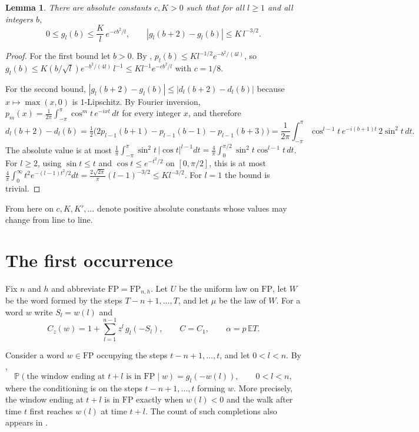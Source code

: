 \documentclass[11pt]{amsart}
\newtheorem{lemma}[theorem]{Lemma}
\theoremstyle{remark}
\numberwithin{equation}{section}
\newcommand{\PP}{\mathbb{P}}
\newcommand{\EE}{\mathbb{E}}
\newcommand{\FP}{\mathrm{FP}}
\begin{document}
\begin{lemma}\label{lem:g}
There are absolute constants $c,K>0$ such that for all $l\ge1$ and all integers $b$,
\[
0\le g_l(b)\le\frac Kl\,e^{-cb^2/l},\qquad |g_l(b+2)-g_l(b)|\le K\,l^{-3/2}.
\]
\end{lemma}

\begin{proof}
For the first bound let $b>0$. By \cite[(2.3)]{Sh26}, $p_l(b)\le Kl^{-1/2}e^{-b^2/(4l)}$, so $g_l(b)\le K(b/\sqrt l)e^{-b^2/(4l)}\,l^{-1}\le Kl^{-1}e^{-cb^2/l}$ with $c=1/8$.

For the second bound, $|g_l(b+2)-g_l(b)|\le|d_l(b+2)-d_l(b)|$ because $x\mapsto\max(x,0)$ is $1$-Lipschitz. By Fourier inversion, $p_m(x)=\frac1{2\pi}\int_{-\pi}^{\pi}\cos^mt\,e^{-ixt}\,dt$ for every integer $x$, and therefore
\[
d_l(b+2)-d_l(b)=\tfrac12\bigl(2p_{l-1}(b+1)-p_{l-1}(b-1)-p_{l-1}(b+3)\bigr)=\frac1{2\pi}\int_{-\pi}^{\pi}\cos^{l-1}t\,e^{-i(b+1)t}\,2\sin^2t\,dt.
\]
The absolute value is at most $\frac1\pi\int_{-\pi}^{\pi}\sin^2t\,|\cos t|^{l-1}dt=\frac4\pi\int_0^{\pi/2}\sin^2t\cos^{l-1}t\,dt$. For $l\ge2$, using $\sin t\le t$ and $\cos t\le e^{-t^2/2}$ on $[0,\pi/2]$, this is at most $\frac4\pi\int_0^\infty t^2e^{-(l-1)t^2/2}dt=\frac{2\sqrt{2\pi}}{\pi}(l-1)^{-3/2}\le Kl^{-3/2}$. For $l=1$ the bound is trivial.
\end{proof}
From here on $c,K,K',\dots$ denote positive absolute constants whose values may change from line to line.

\section{The first occurrence}\label{sec:first}

Fix $n$ and $h$ and abbreviate $\FP=\FP_{n,h}$. Let $U$ be the uniform law on $\FP$, let $W$ be the word formed by the steps $T-n+1,\dots,T$, and let $\mu$ be the law of $W$. For a word $w$ write $S_l=w(l)$ and
\[
C_z(w)=1+\sum_{l=1}^{n-1}z^l\,g_l(-S_l),\qquad C=C_1,\qquad\alpha=p\,\EE T.
\]

Consider a word $w\in\FP$ occupying the steps $t-n+1,\dots,t$, and let $0<l<n$. By \cite[Lemma~4.2]{Sh26},
\begin{equation}\label{eq:overlap}
\PP(\text{the window ending at $t+l$ is in }\FP\mid w)=g_l(-w(l)),\qquad 0<l<n,
\end{equation}
where the conditioning is on the steps $t-n+1,\dots,t$ forming $w$. More precisely, the window ending at $t+l$ is in $\FP$ exactly when $w(l)<0$ and the walk after time $t$ first reaches $w(l)$ at time $t+l$. The count of such completions also appears in \cite[(2.21)]{PT}.
\end{document}
